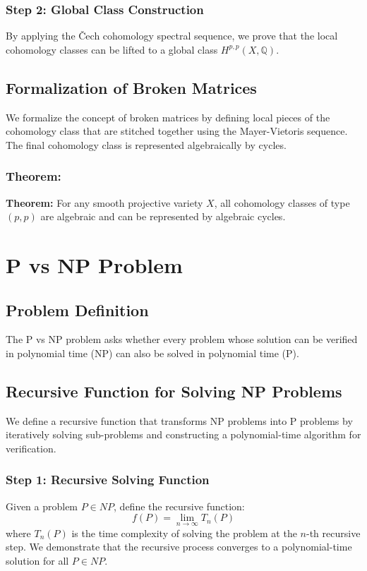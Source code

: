 \documentclass[12pt]{article}
\begin{document}
\subsubsection{Step 2: Global Class Construction}
By applying the Čech cohomology spectral sequence, we prove that the local cohomology classes can be lifted to a global class \( H^{p,p}(X, \mathbb{Q}) \).

\subsection{Formalization of Broken Matrices}
We formalize the concept of broken matrices by defining local pieces of the cohomology class that are stitched together using the Mayer-Vietoris sequence. The final cohomology class is represented algebraically by cycles.

\subsubsection{Theorem:}
\textbf{Theorem:} For any smooth projective variety \( X \), all cohomology classes of type \( (p, p) \) are algebraic and can be represented by algebraic cycles.

\newpage

\section{P vs NP Problem}

\subsection{Problem Definition}
The P vs NP problem asks whether every problem whose solution can be verified in polynomial time (NP) can also be solved in polynomial time (P).

\subsection{Recursive Function for Solving NP Problems}
We define a recursive function that transforms NP problems into P problems by iteratively solving sub-problems and constructing a polynomial-time algorithm for verification.

\subsubsection{Step 1: Recursive Solving Function}
Given a problem \( P \in NP \), define the recursive function:
\[
f(P) = \lim_{n \to \infty} T_n(P)
\]
where \( T_n(P) \) is the time complexity of solving the problem at the \( n \)-th recursive step. We demonstrate that the recursive process converges to a polynomial-time solution for all \( P \in NP \).
\end{document}
